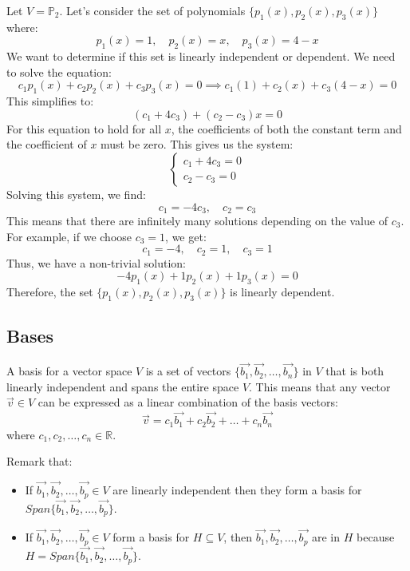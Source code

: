 \begin{eg}
    Let $V = \mathbb{P}_2$. Let's consider the set of polynomials $\{p_1(x), p_2(x), p_3(x)\}$ where:
    \[ p_1(x) = 1, \quad p_2(x) = x, \quad p_3(x) = 4 - x \]
    We want to determine if this set is linearly independent or dependent. We need to solve the equation:
    \[
        c_1 p_1(x) + c_2 p_2(x) + c_3 p_3(x) = 0 \implies c_1 (1) + c_2 (x) + c_3 (4 - x) = 0
    \]
    This simplifies to:
    \[ (c_1 + 4c_3) + (c_2 - c_3)x = 0 \]
    For this equation to hold for all $x$, the coefficients of both the constant term and the coefficient of $x$ must be zero. This gives us the system:
    \[ \begin{cases}
        c_1 + 4c_3 = 0 \\
        c_2 - c_3 = 0
    \end{cases} \]
    Solving this system, we find:
    \[ c_1 = -4c_3, \quad c_2 = c_3 \]
    This means that there are infinitely many solutions depending on the value of $c_3$. For example, if we choose $c_3 = 1$, we get:
    \[ c_1 = -4, \quad c_2 = 1, \quad c_3 = 1 \]
    Thus, we have a non-trivial solution:
    \[ -4p_1(x) + 1p_2(x) + 1p_3(x) = 0 \]
    Therefore, the set $\{p_1(x), p_2(x), p_3(x)\}$ is linearly dependent.
\end{eg}

\subsection{Bases}
\begin{definition}[Basis]
    A basis for a vector space $V$ is a set of vectors $\{\vec{b_1}, \vec{b_2}, \ldots, \vec{b_n}\}$ in $V$ that is both linearly independent and spans the entire space $V$. This means that any vector $\vec{v} \in V$ can be expressed as a linear combination of the basis vectors:
    \[ \vec{v} = c_1 \vec{b_1} + c_2 \vec{b_2} + \ldots + c_n \vec{b_n} \]
    where $c_1, c_2, \ldots, c_n \in \mathbb{R}$.
\end{definition}
Remark that:
\begin{itemize}
    \item If $\vec{b_1}, \vec{b_2}, \ldots, \vec{b_p} \in V$ are linearly independent then they form a basis for $Span\{\vec{b_1}, \vec{b_2}, \ldots, \vec{b_p}\}$.
    \item If $\vec{b_1}, \vec{b_2}, \ldots, \vec{b_p} \in V$ form a basis for $H \subseteq V$, then $\vec{b_1}, \vec{b_2}, \ldots, \vec{b_p}$ are in $H$ because $H = Span\{\vec{b_1}, \vec{b_2}, \ldots, \vec{b_p}\}$.
\end{itemize}

